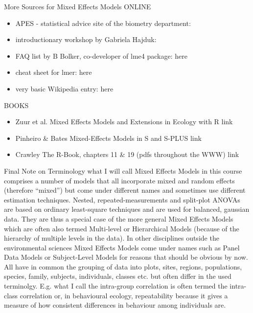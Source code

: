 \documentclass{beamer}
\begin{document}
\begin{frame}{More Sources for Mixed Effects Models}
ONLINE
  \begin{itemize}
    \item APES - statistical advice site of the biometry department: 
    \item introductionary workshop by Gabriela Hajduk:
    \item FAQ list by B Bolker, co-developer of lme4 package: here
    \item cheat sheet for lmer: here
    \item very basic Wikipedia entry: here
  \end{itemize}

BOOKS
  \begin{itemize}
    \item Zuur et al. Mixed Effects Models and Extensions in Ecology with R link
    \item Pinheiro & Bates Mixed-Effects Models in S and S-PLUS link
    \item Crawley The R-Book, chapters 11 & 19 (pdfs throughout the WWW) link
  \end{itemize}
  
\end{frame}

\begin{frame}{Final Note on Terminology}
  \footnotesize{
    what I will call Mixed Effects Models in this course comprises a number of models that all incorporate mixed and random effects (therefore “mixed”) but come under different names and sometimes use different estimation techniques. Nested, repeated-measurements and split-plot ANOVAs are based on ordinary least-square techniques and are used for balanced, gaussian data. They are thus a special case of the more general Mixed Effects Models which are often also termed Multi-level or Hierarchical Models (because of the hierarchy of multiple levels in the data). In other disciplines outside the environmental sciences Mixed Effects Models come under names such as Panel Data Models or Subject-Level Models for reasons that should be obvious by now. All have in common the grouping of data into plots, sites, regions, populations, species, family, subjects, individuals, classes etc. but often differ in the used terminolgy. E.g. what I call the intra-group correlation is often termed the intra-class correlation or, in behavioural ecology, repeatability because it gives a measure of how consistent differences in behaviour among individuals are. 
  }
\end{frame}
\end{document}
